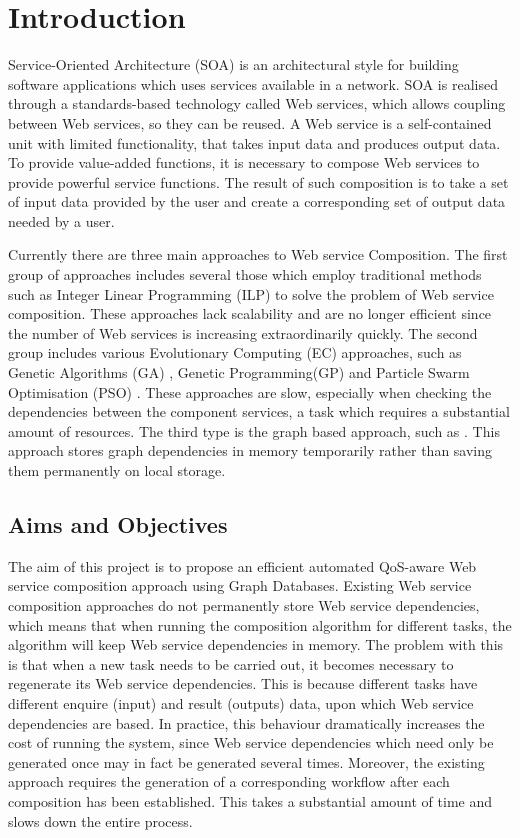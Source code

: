 \chapter{Introduction}\label{C:intro}
Service-Oriented Architecture (SOA) \cite{1} is an architectural style for building software applications which uses services available in a network. SOA is realised through a standards-based technology called Web services, which allows coupling between Web services, so they can be reused. A Web service is a self-contained unit with limited functionality, that takes input data and produces output data. To provide value-added functions, it is necessary to compose Web services to provide powerful service functions. The result of such composition is to take a set of input data provided by the user and create a corresponding set of output data needed by a user.  

Currently there are three main approaches to Web service Composition. The first group of approaches includes several those which employ traditional methods such as Integer Linear Programming (ILP) \cite{7} to solve the problem of Web service composition. These approaches lack scalability and are no longer efficient since the number of Web services is increasing extraordinarily quickly. The second group includes various Evolutionary Computing (EC) approaches, such as Genetic Algorithms (GA) \cite{8}, Genetic Programming(GP) \cite{14,2,9} and Particle Swarm Optimisation (PSO) \cite{10,19}. These approaches are slow, especially when checking the dependencies between the component services, a task which requires a substantial amount of resources. The third type is the graph based approach, such as \cite{13,5}. This approach stores graph dependencies in memory temporarily rather than saving them permanently on local storage.


\section{Aims and Objectives}
The aim of this project is to propose an efficient automated QoS-aware Web service composition approach using Graph Databases. Existing Web service composition approaches \cite{2, 4} do not permanently store Web service dependencies, which means that when running the composition algorithm for different tasks, the algorithm will keep Web service dependencies in memory. The problem with this is that when a new task needs to be carried out, it becomes necessary to regenerate its Web service dependencies. This is because different tasks have different enquire (input) and result (outputs) data, upon which Web service dependencies are based. In practice, this behaviour dramatically increases the cost of running the system, since Web service dependencies which need only be generated once may in fact be generated several times. Moreover, the existing approach requires the generation of a corresponding workflow after each composition has been established. This takes a substantial amount of time and slows down the entire process.



